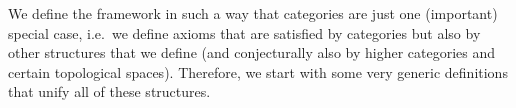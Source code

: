 \documentclass[a4paper]{article}
\theoremstyle{definition}
\theoremstyle{remark}
\newcommand{\defn}{\emph}
\renewcommand{\phi}{\varphi}
\renewcommand{\equiv}{\simeq}
\newcommand{\nm}{\mathsf}
\newcommand{\id}{\nm{id}}
\begin{document}
% 
% 
% 
% 

We define the framework in such a way that categories are just one (important) special case, i.e.\ we define
axioms that are satisfied by categories but also by other structures that we define (and conjecturally also
by higher categories and certain topological spaces). Therefore, we start with some very generic definitions
that unify all of these structures.
\end{document}
